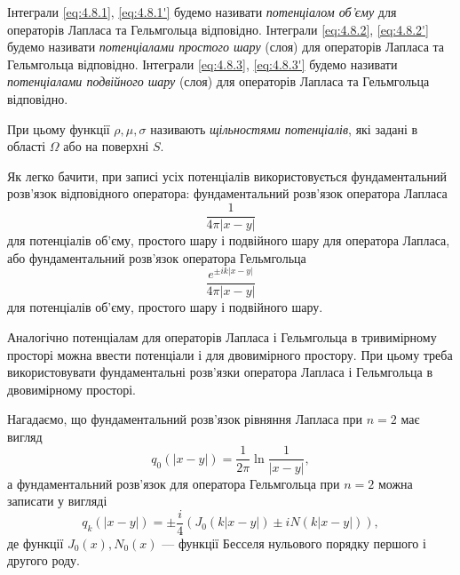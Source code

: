 \begin{definition}
	Інтеграли \eqref{eq:4.8.1}, \eqref{eq:4.8.1'} будемо називати \textit{потенціалом об'єму} для операторів Лапласа та Гельмгольца відповідно. Інтеграли \eqref{eq:4.8.2}, \eqref{eq:4.8.2'} будемо називати \textit{потенціалами простого шару} (слоя) для операторів Лапласа та Гельмгольца відповідно. Інтеграли \eqref{eq:4.8.3}, \eqref{eq:4.8.3'} будемо називати \textit{потенціалами подвійного шару} (слоя) для операторів Лапласа та Гельмгольца відповідно.
\end{definition}

\begin{definition}
	При цьому функції $\rho, \mu, \sigma$ називають \textit{щільностями потенціалів}, які задані в області $\Omega$ або на поверхні $S$.
\end{definition}

Як легко бачити, при записі усіх потенціалів використовується фундаментальний розв'язок відповідного оператора: фундаментальний розв'язок оператора Лапласа
\begin{equation}
	\frac{1}{4 \pi |x - y|}
\end{equation}
для потенціалів об'єму, простого шару і подвійного шару для оператора Лапласа, або фундаментальний розв'язок оператора Гельмгольца
\begin{equation}
	\frac{e^{\pm i k |x - y|}}{4 \pi |x - y|}	
\end{equation}
для потенціалів об'єму, простого шару і подвійного шару. \medskip

Аналогічно потенціалам для операторів Лапласа і Гельмгольца в тривимірному просторі можна ввести потенціали і для двовимірного простору. При цьому треба використовувати фундаментальні розв'язки оператора Лапласа і Гельмгольца в двовимірному просторі. \medskip

Нагадаємо, що фундаментальний розв'язок рівняння Лапласа при $n = 2$ має вигляд
\begin{equation}
	q_0(|x - y|) = \frac{1}{2 \pi} \ln \frac{1}{|x - y|},
\end{equation}
а фундаментальний розв'язок для оператора Гельмгольца при $n = 2$ можна записати у вигляді 
\begin{equation}
	\label{eq:4.8.4}
	q_k (|x - y|) = \pm \frac{i}{4} \left( J_0(k |x - y|) \pm i N(k |x - y|) \right),
\end{equation}
де функції $J_0(x), N_0(x)$ --- функції Бесселя нульового порядку першого і другого роду.  \medskip

